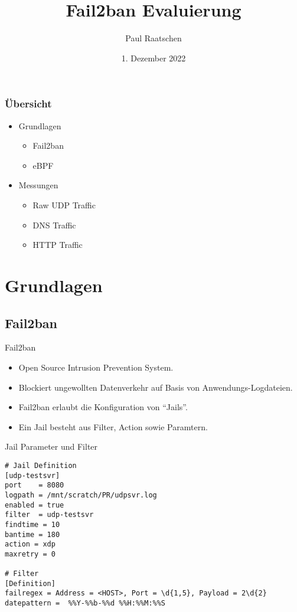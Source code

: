 \documentclass[11pt,german,table,dvipsnames]{beamer}
\title{Fail2ban Evaluierung}
\author[Paul Raatschen]{Paul Raatschen}
\date{1. Dezember 2022}
\institute[Uni Potsdam]{\texttt{[image: images/bsvs-logo.eps]}}%
\begin{document}
\begin{frame}[plain]
    \titlepage
\end{frame}

\begin{frame}
\frametitle{Übersicht}

\begin{itemize}
    \item Grundlagen  
        \begin{itemize}
        \item Fail2ban 
        \item eBPF
    \end{itemize}
    \item Messungen
    \begin{itemize}
        \item Raw UDP Traffic
        \item DNS Traffic
        \item HTTP Traffic
    \end{itemize}
    
\end{itemize}

\end{frame}

\section{Grundlagen}

\subsection{Fail2ban}

\begin{frame}{Fail2ban}
    \begin{itemize}
        \item Open Source Intrusion Prevention System.
        \item Blockiert ungewollten Datenverkehr auf Basis von Anwendungs-Logdateien.
        \item Fail2ban erlaubt die Konfiguration von ``Jails''.
        \item Ein Jail besteht aus Filter, Action sowie Paramtern. 
    \end{itemize}
\end{frame}

\begin{frame}[fragile]{Jail Parameter und Filter}

\begin{Verbatim}[fontsize=\small]
# Jail Definition
[udp-testsvr]
port    = 8080
logpath = /mnt/scratch/PR/udpsvr.log
enabled = true
filter  = udp-testsvr
findtime = 10
bantime = 180
action = xdp
maxretry = 0

# Filter
[Definition]
failregex = Address = <HOST>, Port = \d{1,5}, Payload = 2\d{2}
datepattern =  %%Y-%%b-%%d %%H:%%M:%%S
\end{Verbatim}
\end{frame}
\end{document}
